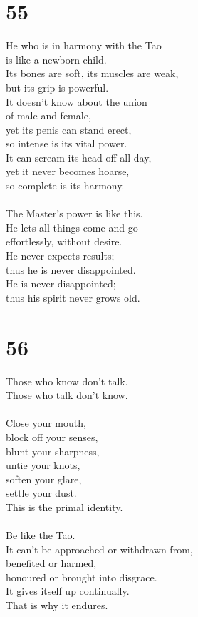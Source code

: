 \documentclass[b5paper, 12pt, oneside]{book}
\begin{document}
\chapter*{55}
He who is in harmony with the Tao\\
is like a newborn child.\\
Its bones are soft, its muscles are weak,\\
but its grip is powerful.\\
It doesn't know about the union\\
of male and female,\\
yet its penis can stand erect,\\
so intense is its vital power.\\
It can scream its head off all day,\\
yet it never becomes hoarse,\\
so complete is its harmony.\\
\\
The Master's power is like this.\\
He lets all things come and go\\
effortlessly, without desire.\\
He never expects results;\\
thus he is never disappointed.\\
He is never disappointed;\\
thus his spirit never grows old.\\

\chapter*{56}
Those who know don't talk.\\
Those who talk don't know.\\
\\
Close your mouth,\\
block off your senses,\\
blunt your sharpness,\\
untie your knots,\\
soften your glare,\\
settle your dust.\\
This is the primal identity.\\
\\
Be like the Tao.\\
It can't be approached or withdrawn from,\\
benefited or harmed,\\
honoured or brought into disgrace.\\
It gives itself up continually.\\
That is why it endures.
\end{document}

